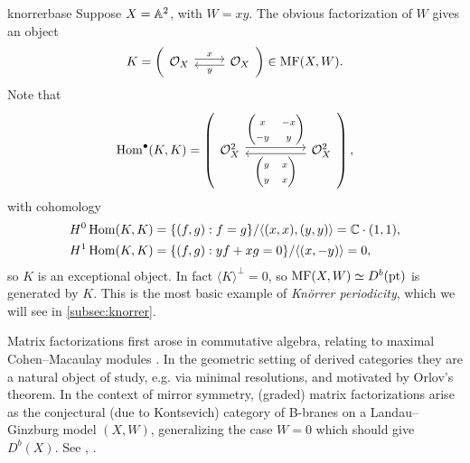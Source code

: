 \begin{example}{}{knorrerbase}
     Suppose $X=\mathbb{A}^2$, with $W=xy$. The obvious factorization of $W$ gives an
     object
     \begin{equation*}
         K = \left(\begin{tikzcd}
             \O_X \ar[r,"x",shift left] &
             \O_X \ar[l,"y",shift left]
         \end{tikzcd}\right) \in\MF(X,W).
     \end{equation*}
     Note that
     \begin{equation*}
         \Hom^\bullet(K,K) =
         \left(\begin{tikzcd}[ampersand replacement=\&,column sep=huge]
                 \O_X^2 \ar[shift left]{r}{\begin{pmatrix}
                     x & -x \\ -y & y
                 \end{pmatrix}} \&
                 \O_X^2 \ar[shift left]{l}{\begin{pmatrix}
                     y & x \\ y & x
                 \end{pmatrix}}
         \end{tikzcd}\right),
     \end{equation*}
     with cohomology
     \begin{align*}
         H^0\operatorname{Hom}(K,K) &= \{(f,g):f=g\}/\langle(x,x),(y,y)\rangle
             = \mathbb{C}\cdot(1,1), \\
         H^1\operatorname{Hom}(K,K) &= \{(f,g):yf+xg=0\}/\langle(x,-y)\rangle
             = 0,
     \end{align*}
     so $K$ is an exceptional object. In fact $\langle K\rangle^\perp=0$, so
     $\mathrm{MF}(X,W)\simeq D^b(\mathrm{pt})$ is generated by $K$. This is the most basic
     example of \emph{Kn\"orrer periodicity}, which we will see in
     \ref{subsec:knorrer}.
\end{example}

\begin{remark}{}{}
    Matrix factorizations first arose in commutative algebra, relating to
    maximal Cohen--Macaulay modules \cite{Eisenbud}. In the geometric setting of
    derived categories they are a natural object of study, e.g. via minimal
    resolutions, and motivated by Orlov's theorem. In the context of mirror
    symmetry, (graded) matrix factorizations arise as the conjectural (due to
    Kontsevich) category of B-branes on a Landau--Ginzburg model $(X,W)$,
    generalizing the case $W=0$ which should give $D^b(X)$. See
    \cite{OrlovTheorem}, \cite{Ed}.
\end{remark}


